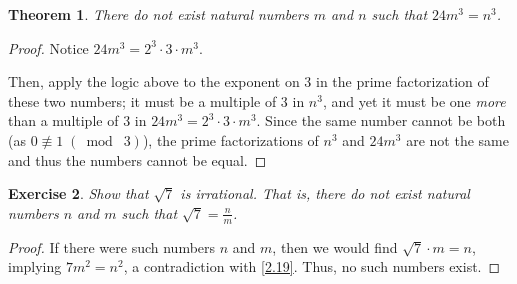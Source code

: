 \documentclass{article}
\newtheorem{thm}{Theorem}[section]
\newtheorem{ex}[thm]{Exercise}
\numberwithin{equation}{thm}
\providecommand{\gmod}[1]{\; (\bmod \; #1)}
\begin{document}
\begin{thm} \label{2.20}
  There do not exist natural numbers $m$ and $n$ such that $24m^3 = n^3$.
\end{thm}

\begin{proof}
  Notice $24m^3 = 2^3 \cdot 3 \cdot m^3$.

  Then, apply the logic above to the exponent on $3$ in the prime factorization of these two numbers; it must be a multiple of $3$ in $n^3$, and yet it must be one \emph{more} than a multiple of $3$ in $24m^3 = 2^3 \cdot 3 \cdot m^3$. Since the same number cannot be both (as $0 \not \equiv 1 \gmod 3$), the prime factorizations of $n^3$ and $24m^3$ are not the same and thus the numbers cannot be equal.
\end{proof}



\begin{ex} \label{2.21}
  Show that $\sqrt{7}$ is irrational. That is, there do not exist natural numbers $n$ and $m$ such that $\sqrt{7} = \frac{n}{m}$.
\end{ex}

\begin{proof}
  If there were such numbers $n$ and $m$, then we would find $\sqrt{7} \cdot m = n$, implying $7m^2 = n^2$, a contradiction with \ref{2.19}. Thus, no such numbers exist.
\end{proof}
\end{document}
